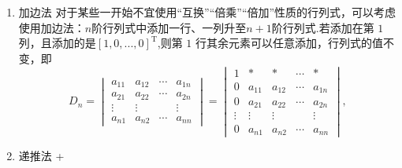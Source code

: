 \begin{enumerate}
\begin{enumerate}
$$\begin{vmatrix}
                            x_1^{n-1} & x_2^{n-1} & \cdots & x_n^{n-1}
                        \end{vmatrix}=\prod_{1\leq i<j\leq n}(x_j-x_i),n\geq2.$$
          \end{enumerate}
          \begin{note}{行列式计算思路}{行列式计算思路}
              \begin{enumerate}
                  \item 若所给行列式就是基本形或接近基本形，则直接套公式或经过简单处理化成基本形后套公式．
                  \item 简单处理的手段： \DTwoOne
                        \begin{enumerate}
                            \item 按零元素多的行或列展开；
                            \item 用行列式的性质对差别最小的“对应位置元素”进行处理，尽可能多地化出零元素，再按此行或列展开；
                            \item 对于行和或列和相等的情形，将所有列加到第1列或将所有行加到第1行，提出公因式，再用上述方法，等等．
                        \end{enumerate}
                  \item 具体型行列式的元素中若含$x$，则其为$x$的多项式．
              \end{enumerate}
          \end{note}
    \item 加边法
          \DTwoThree
          对于某些一开始不宜使用“互换”“倍乘”“倍加”性质的行列式，可以考虑使用加边法：$n$阶行列式中添加一行、一列升至$n+1$阶行列式.若添加在第 $1$ 列，且添加的是$[ 1, 0,...,0]^\mathrm{T}$,则第 $1$ 行其余元素可以任意添加，行列式的值不变，即
          $$D_n=
              \begin{vmatrix}
                  a_{11} & a_{12} & \cdots & a_{1n} \\
                  a_{21} & a_{22} & \cdots & a_{2n} \\
                  \vdots & \vdots &        & \vdots \\
                  a_{n1} & a_{n2} & \cdots & a_{nn}
              \end{vmatrix}=
              \begin{vmatrix}
                  1      & *      & *      & \cdots & *      \\
                  0      & a_{11} & a_{12} & \cdots & a_{1n} \\
                  0      & a_{21} & a_{22} & \cdots & a_{2n} \\
                  \vdots & \vdots & \vdots &        & \vdots \\
                  0      & a_{n1} & a_{n2} & \cdots & a_{nn}
              \end{vmatrix},$$
    \item 递推法
          \DOne+\DTwoOne


\end{enumerate}
